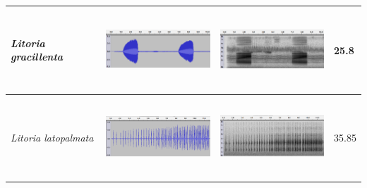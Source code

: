 \begin{table}[htb!]
\centering
\begin{tabular}{llll}
\hline
\textit{Litoria gracillenta} &     \begin{minipage}{.3\textwidth} \includegraphics[width=45mm, height=30mm]{image/Ch1/graci_wav.png}  \end{minipage}   &    \begin{minipage}{.3\textwidth} \includegraphics[width=45mm, height=30mm]{image/Ch1/graci_spec.png}     \end{minipage}    & 25.8  \\ \hline
\textit{Litoria latopalmata} &      \begin{minipage}{.3\textwidth} \includegraphics[width=45mm, height=30mm]{image/Ch1/latop_wav.png}  \end{minipage}  &    \begin{minipage}{.3\textwidth} \includegraphics[width=45mm, height=30mm]{image/Ch1/latop_spec.png}    \end{minipage}     & 35.85 \\ \hline

\end{tabular}
\end{table}
